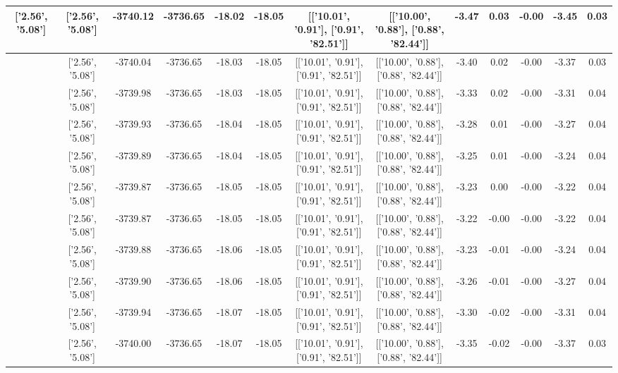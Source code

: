 \begin{table}[htbp]
\begin{adjustbox}{angle=90}
\begin{tabular}{|c|c|c|c|c|c|c|c|c|c|c|c|c|}
 ['2.56', '5.08'] & ['2.56', '5.08'] & -3740.12 & -3736.65 & -18.02 & -18.05 & [['10.01', '0.91'], ['0.91', '82.51']] & [['10.00', '0.88'], ['0.88', '82.44']] & -3.47 & 0.03 & -0.00 & -3.45 & 0.03\\ \hline
 ['2.56', '5.08'] & ['2.56', '5.08'] & -3740.04 & -3736.65 & -18.03 & -18.05 & [['10.01', '0.91'], ['0.91', '82.51']] & [['10.00', '0.88'], ['0.88', '82.44']] & -3.40 & 0.02 & -0.00 & -3.37 & 0.03\\ \hline
 ['2.56', '5.08'] & ['2.56', '5.08'] & -3739.98 & -3736.65 & -18.03 & -18.05 & [['10.01', '0.91'], ['0.91', '82.51']] & [['10.00', '0.88'], ['0.88', '82.44']] & -3.33 & 0.02 & -0.00 & -3.31 & 0.04\\ \hline
 ['2.56', '5.08'] & ['2.56', '5.08'] & -3739.93 & -3736.65 & -18.04 & -18.05 & [['10.01', '0.91'], ['0.91', '82.51']] & [['10.00', '0.88'], ['0.88', '82.44']] & -3.28 & 0.01 & -0.00 & -3.27 & 0.04\\ \hline
 ['2.56', '5.08'] & ['2.56', '5.08'] & -3739.89 & -3736.65 & -18.04 & -18.05 & [['10.01', '0.91'], ['0.91', '82.51']] & [['10.00', '0.88'], ['0.88', '82.44']] & -3.25 & 0.01 & -0.00 & -3.24 & 0.04\\ \hline
 ['2.56', '5.08'] & ['2.56', '5.08'] & -3739.87 & -3736.65 & -18.05 & -18.05 & [['10.01', '0.91'], ['0.91', '82.51']] & [['10.00', '0.88'], ['0.88', '82.44']] & -3.23 & 0.00 & -0.00 & -3.22 & 0.04\\ \hline
 ['2.56', '5.08'] & ['2.56', '5.08'] & -3739.87 & -3736.65 & -18.05 & -18.05 & [['10.01', '0.91'], ['0.91', '82.51']] & [['10.00', '0.88'], ['0.88', '82.44']] & -3.22 & -0.00 & -0.00 & -3.22 & 0.04\\ \hline
 ['2.56', '5.09'] & ['2.56', '5.08'] & -3739.88 & -3736.65 & -18.06 & -18.05 & [['10.01', '0.91'], ['0.91', '82.51']] & [['10.00', '0.88'], ['0.88', '82.44']] & -3.23 & -0.01 & -0.00 & -3.24 & 0.04\\ \hline
 ['2.57', '5.09'] & ['2.56', '5.08'] & -3739.90 & -3736.65 & -18.06 & -18.05 & [['10.01', '0.91'], ['0.91', '82.51']] & [['10.00', '0.88'], ['0.88', '82.44']] & -3.26 & -0.01 & -0.00 & -3.27 & 0.04\\ \hline
 ['2.57', '5.09'] & ['2.56', '5.08'] & -3739.94 & -3736.65 & -18.07 & -18.05 & [['10.01', '0.91'], ['0.91', '82.51']] & [['10.00', '0.88'], ['0.88', '82.44']] & -3.30 & -0.02 & -0.00 & -3.31 & 0.04\\ \hline
 ['2.57', '5.09'] & ['2.56', '5.08'] & -3740.00 & -3736.65 & -18.07 & -18.05 & [['10.01', '0.91'], ['0.91', '82.51']] & [['10.00', '0.88'], ['0.88', '82.44']] & -3.35 & -0.02 & -0.00 & -3.37 & 0.03\\ \hline

\end{tabular}
\end{adjustbox}
\end{table}
